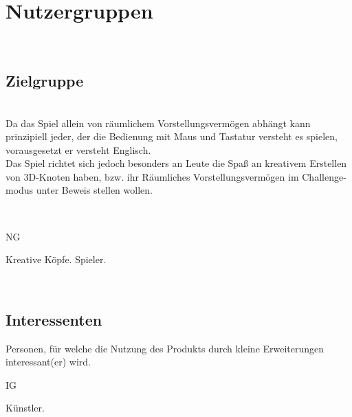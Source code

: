 %
%


\chapter{Nutzergruppen}
\label{NG}~\\


\section{Zielgruppe}
\label{NG:ZG}

~\\
Da das Spiel allein von räumlichem Vorstellungsvermögen abhängt kann prinzipiell jeder, der die Bedienung mit Maus und Tastatur versteht es spielen, vorausgesetzt er versteht Englisch.
\\
Das Spiel richtet sich jedoch besonders an Leute die Spaß an kreativem Erstellen von 3D-Knoten haben, bzw. ihr Räumliches Vorstellungsvermögen im Challenge-modus unter Beweis stellen wollen.

~\\

\begin{ids}{\gls{NG}}

	\id[10] Kreative Köpfe.
	\id[20] Spieler.

\end{ids}
~\\



\section{Interessenten}
\label{NG:Interessenten}

Personen, für welche die Nutzung des Produkts durch kleine Erweiterungen interessant(er) wird.\\


\begin{ids}{\gls{IG}}

	\id[30] Künstler.

\end{ids}
